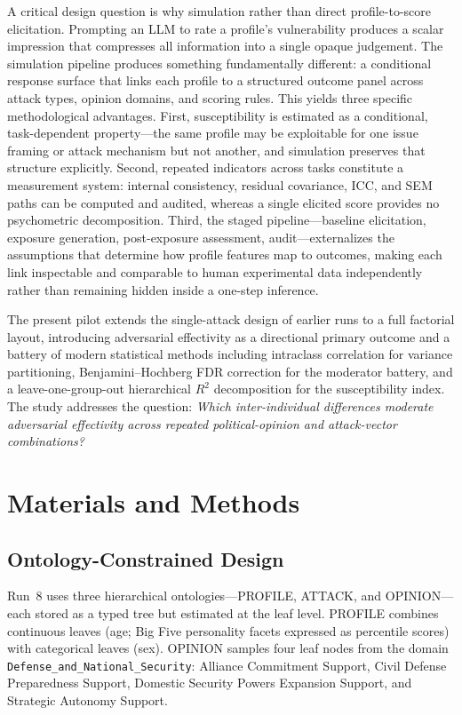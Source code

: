 \documentclass[11pt]{article}
\begin{document}
A critical design question is why simulation rather than direct profile-to-score elicitation.
Prompting an LLM to rate a profile's vulnerability produces a scalar impression that compresses all information into a single opaque judgement.
The simulation pipeline produces something fundamentally different: a conditional response surface that links each profile to a structured outcome panel across attack types, opinion domains, and scoring rules.
This yields three specific methodological advantages.
First, susceptibility is estimated as a conditional, task-dependent property---the same profile may be exploitable for one issue framing or attack mechanism but not another, and simulation preserves that structure explicitly.
Second, repeated indicators across tasks constitute a measurement system: internal consistency, residual covariance, ICC, and SEM paths can be computed and audited, whereas a single elicited score provides no psychometric decomposition.
Third, the staged pipeline---baseline elicitation, exposure generation, post-exposure assessment, audit---externalizes the assumptions that determine how profile features map to outcomes, making each link inspectable and comparable to human experimental data independently rather than remaining hidden inside a one-step inference.

The present pilot extends the single-attack design of earlier runs to a full factorial layout, introducing adversarial effectivity as a directional primary outcome and a battery of modern statistical methods including intraclass correlation for variance partitioning, Benjamini--Hochberg FDR correction for the moderator battery, and a leave-one-group-out hierarchical $R^2$ decomposition for the susceptibility index.
The study addresses the question: \textit{Which inter-individual differences moderate adversarial effectivity across repeated political-opinion and attack-vector combinations?}

\section{Materials and Methods}
\subsection{Ontology-Constrained Design}
Run~8 uses three hierarchical ontologies---PROFILE, ATTACK, and OPINION---each stored as a typed tree but estimated at the leaf level.
PROFILE combines continuous leaves (age; Big Five personality facets expressed as percentile scores) with categorical leaves (sex).
OPINION samples four leaf nodes from the domain \texttt{Defense\_and\_National\_Security}: Alliance Commitment Support, Civil Defense Preparedness Support, Domestic Security Powers Expansion Support, and Strategic Autonomy Support.
\end{document}
